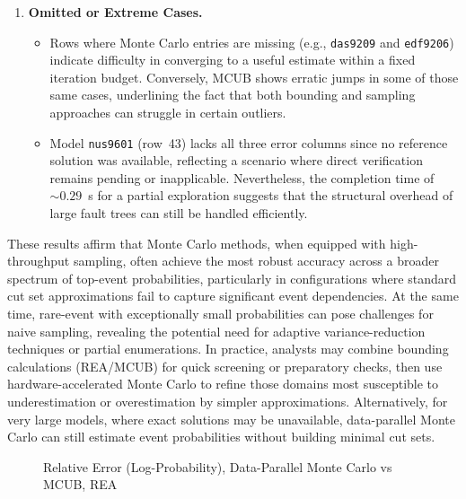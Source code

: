 \begin{enumerate}
    \item \textbf{Omitted or Extreme Cases.}
    \begin{itemize}
        \item Rows where Monte Carlo entries are missing (e.g., \texttt{das9209} and \texttt{edf9206}) indicate difficulty in converging to a useful estimate within a fixed iteration budget. Conversely, MCUB shows erratic jumps in some of those same cases, underlining the fact that both bounding and sampling approaches can struggle in certain outliers.
        \item Model \texttt{nus9601} (row~43) lacks all three error columns since no reference solution was available, reflecting a scenario where direct verification remains pending or inapplicable. Nevertheless, the completion time of \(\sim 0.29\)~s for a partial exploration suggests that the structural overhead of large fault trees can still be handled efficiently.
    \end{itemize}
\end{enumerate}

These results affirm that Monte Carlo methods, when equipped with high-throughput sampling, often achieve the most robust accuracy across a broader spectrum of top-event probabilities, particularly in configurations where standard cut set approximations fail to capture significant event dependencies. At the same time, rare-event with exceptionally small probabilities can pose challenges for naive sampling, revealing the potential need for adaptive variance-reduction techniques or partial enumerations. In practice, analysts may combine bounding calculations (REA/MCUB) for quick screening or preparatory checks, then use hardware-accelerated Monte Carlo to refine those domains most susceptible to underestimation or overestimation by simpler approximations. Alternatively, for very large models, where exact solutions may be unavailable, data-parallel Monte Carlo can still estimate event probabilities without building minimal cut sets. 

\begin{landscape}
\begin{figure}[p]
    \centering
    
    \caption{Relative Error (Log-Probability), Data-Parallel Monte Carlo vs MCUB, REA}
    \label{fig:canopy_rel_error_plot}
\end{figure}
\end{landscape}


